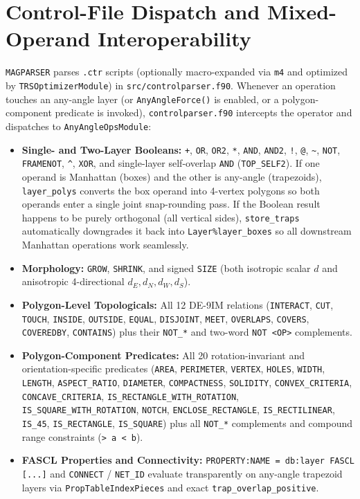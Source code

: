 \section{Control-File Dispatch and Mixed-Operand Interoperability}

\texttt{MAGPARSER} parses \texttt{.ctr} scripts (optionally macro-expanded via \texttt{m4} and optimized by \texttt{TRSOptimizerModule}) in \texttt{src/controlparser.f90}. Whenever an operation touches an any-angle layer (or \texttt{AnyAngleForce()} is enabled, or a polygon-component predicate is invoked), \texttt{controlparser.f90} intercepts the operator and dispatches to \texttt{AnyAngleOpsModule}:
\begin{itemize}
  \item \textbf{Single- and Two-Layer Booleans:} \texttt{+}, \texttt{OR}, \texttt{OR2}, \texttt{*}, \texttt{AND}, \texttt{AND2}, \texttt{!}, \texttt{@}, \texttt{\~}, \texttt{NOT}, \texttt{FRAMENOT}, \texttt{\^}, \texttt{XOR}, and single-layer self-overlap \texttt{AND} (\texttt{TOP\_SELF2}). If one operand is Manhattan (boxes) and the other is any-angle (trapezoids), \texttt{layer\_polys} converts the box operand into 4-vertex polygons so both operands enter a single joint snap-rounding pass. If the Boolean result happens to be purely orthogonal (all vertical sides), \texttt{store\_traps} automatically downgrades it back into \texttt{Layer\%layer\_boxes} so all downstream Manhattan operations work seamlessly.
  \item \textbf{Morphology:} \texttt{GROW}, \texttt{SHRINK}, and signed \texttt{SIZE} (both isotropic scalar $d$ and anisotropic 4-directional $d_E, d_N, d_W, d_S$).
  \item \textbf{Polygon-Level Topologicals:} All 12 DE-9IM relations (\texttt{INTERACT}, \texttt{CUT}, \texttt{TOUCH}, \texttt{INSIDE}, \texttt{OUTSIDE}, \texttt{EQUAL}, \texttt{DISJOINT}, \texttt{MEET}, \texttt{OVERLAPS}, \texttt{COVERS}, \texttt{COVEREDBY}, \texttt{CONTAINS}) plus their \texttt{NOT\_*} and two-word \texttt{NOT <OP>} complements.
  \item \textbf{Polygon-Component Predicates:} All 20 rotation-invariant and orientation-specific predicates (\texttt{AREA}, \texttt{PERIMETER}, \texttt{VERTEX}, \texttt{HOLES}, \texttt{WIDTH}, \texttt{LENGTH}, \texttt{ASPECT\_RATIO}, \texttt{DIAMETER}, \texttt{COMPACTNESS}, \texttt{SOLIDITY}, \texttt{CONVEX\_CRITERIA}, \texttt{CONCAVE\_CRITERIA}, \texttt{IS\_RECTANGLE\_WITH\_ROTATION}, \texttt{IS\_SQUARE\_WITH\_ROTATION}, \texttt{NOTCH}, \texttt{ENCLOSE\_RECTANGLE}, \texttt{IS\_RECTILINEAR}, \texttt{IS\_45}, \texttt{IS\_RECTANGLE}, \texttt{IS\_SQUARE}) plus all \texttt{NOT\_*} complements and compound range constraints (\texttt{> a < b}).
  \item \textbf{FASCL Properties and Connectivity:} \texttt{PROPERTY:NAME = db:layer FASCL [...]} and \texttt{CONNECT} / \texttt{NET\_ID} evaluate transparently on any-angle trapezoid layers via \texttt{PropTableIndexPieces} and exact \texttt{trap\_overlap\_positive}.
\end{itemize}

